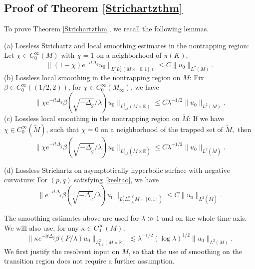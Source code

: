 \documentclass[11pt]{amsart}
\newcommand{\la}{\lambda}
\begin{document}
\subsection{Proof of Theorem \ref{Strichartzthm}}

To prove Theorem \ref{Strichartzthm}, we recall the following lemmas.

\noindent (a) Lossless Strichartz and local smoothing estimates in the nontrapping region: Let $\chi\in C_0^{\infty}(M)$ with $\chi=1$ on a neighborhood of $\pi(K)$,
    \begin{equation}\label{eq:stri-nontrap-region}
    \|(1-\chi)e^{-it\Delta_g}u_0\|_{L^p_tL^q_x(M\times [0,1])}\leq C \|u_0\|_{L^2(M)}.
\end{equation}
(b) Lossless local smoothing in the nontrapping region on $M$: Fix $\beta\in C_0^{\infty}((1/2,2))$,  for $\chi\in C_0^{\infty}(M_\infty)$, we have 
\begin{equation}\label{eq:local-sm-nontrap-M}
   \|\chi e^{-it\Delta_g}\beta(\sqrt{-\Delta_g}/\la)u_0 \|_{L^2_{t,x}(M\times\mathbb R)}\leq C\la^{-1/2}\|u_0\|_{L^2(M)}.
\end{equation}
(c) Lossless local smoothing in the nontrapping region on $\tilde M$: If  we have $\chi\in C_0^{\infty}(\tilde M)$, such that $\chi=0$ on a neighborhood of the trapped set of $\tilde M,$ then \begin{equation}\label{eq:local-sm-nontrap}
   \|\chi e^{-it\Delta_{\tilde g}}\beta(\sqrt{-\Delta_{\tilde g}}/\la)u_0 \|_{L^2_{t,x}(\tilde M\times\mathbb R)}\leq C\la^{-1/2}\|u_0\|_{L^2(\tilde M)}.
\end{equation}





\noindent(d) Lossless Strichartz on asymptotically hyperbolic surface with negative curvature: For $(p,q)$ satisfying \eqref{keeltao}, we have
 \begin{equation}\label{eq:stri-unit-trap}
    \| e^{-it\Delta_{\tilde g}}\beta(\sqrt{-\Delta_{\tilde g}}/\la)u_0\|_{L^p_tL^q_x(\tilde M\times [0,1])}\leq C \|u_0\|_{L^2(\tilde M)}.
\end{equation}

The smoothing estimates above are used for $\la\gg1$ and on the whole time axis. We will also use, for any $\kappa\in C_0^\infty(M)$,
\begin{equation}\label{eq:local-sm-log-M}
\|\kappa e^{-it\Delta_g}\beta(P/\la)u_0\|_{L^2_{t,x}(M\times\mathbb R)}
\lesssim \la^{-1/2}(\log\la)^{1/2}\|u_0\|_{L^2(M)}.
\end{equation}
We first justify the resolvent input on $M$, so that the use of smoothing on the transition region does not require a further assumption.
\end{document}
